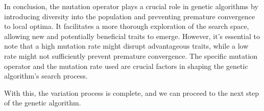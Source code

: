   
  In conclusion, the mutation operator plays a crucial role in genetic 
  algorithms by introducing diversity into the population and preventing 
  premature convergence to local optima.
  It facilitates a more thorough exploration of the search space, allowing new 
  and potentially beneficial traits to emerge.
  However, it's essential to note that a high mutation rate might disrupt 
  advantageous traits, while a low rate might not sufficiently prevent premature
  convergence.
  The specific mutation operator and the mutation rate used are crucial factors 
  in shaping the genetic algorithm's search process.

  With this, the variation process is complete, and we can proceed to the next 
  step of the genetic algorithm.
%